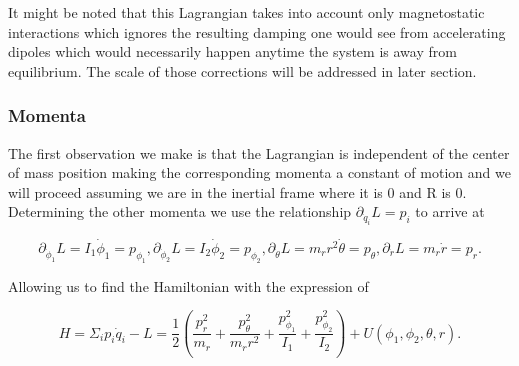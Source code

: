 \documentclass[prbg,preprint]{revtex4-1}
\begin{document}
It might be noted that this Lagrangian takes into account only magnetostatic interactions which ignores the resulting damping one would see from accelerating dipoles which would necessarily happen anytime the system is away from equilibrium. The scale of those corrections will be addressed in  later section.
\subsubsection{Momenta}

The first observation we make is that the Lagrangian is independent of the center of mass position making the corresponding momenta a constant of motion and we will proceed assuming we are in the inertial frame where it is 0 and R is 0. Determining the other momenta we use the relationship $\partial_{\dot q_i} L =p_i$ to arrive at

\begin{subequations}
    \begin{equation}
        \partial_{\dot \phi_1} L = I_1\dot \phi_1 = p_{\phi_1},
    \end{equation}
    \begin{equation}
        \partial_{\dot \phi_2} L =I_2\dot \phi_2 = p_{\phi_2},
    \end{equation}
    \begin{equation}
        \partial_{\dot \theta} L =m_r r^2 \dot \theta = p_{\theta},
    \end{equation}
    \begin{equation}
        \partial_{\dot r} L = m_r \dot r = p_r.
    \end{equation}
\end{subequations}

Allowing us to find the Hamiltonian with the expression of 

\begin{equation}
H=\Sigma_i p_i \dot q_i - L
=
\frac{1}{2}\left(
	\frac{p_r^2}{m_r}
	+\frac{p_\theta^2}{m_r r^2}
	+\frac{p_{\phi_1}^2}{I_1}
	+\frac{p_{\phi_2}^2}{I_2}
\right)+U(\phi_1,\phi_2,\theta, r).
\end{equation}
\end{document}
